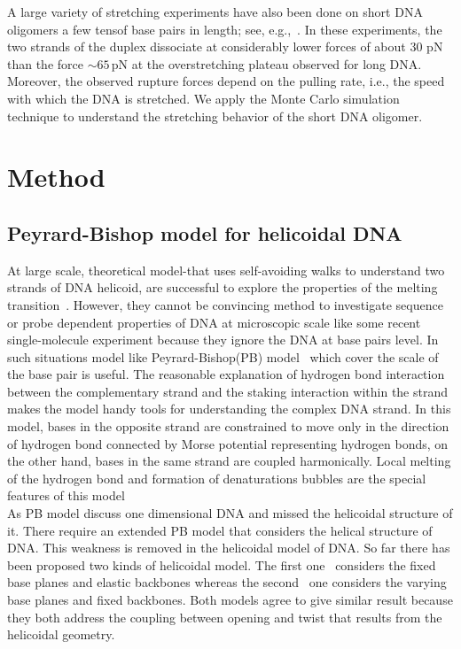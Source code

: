 \documentclass[12pt,masters,final]{UTRGVthesis}
\begin{document}
A large variety of stretching experiments have also been done on short DNA oligomers a few tensof base pairs in length; see, e.g.,~\cite{Strunz:1999, Pope:2001, Morfill:2007}. In these experiments, the two strands of the duplex dissociate at considerably lower forces of about 30 pN than the force $\sim 65$\,pN at the overstretching plateau observed for long DNA. Moreover, the observed rupture forces depend on the pulling rate, i.e., the speed with which the DNA is stretched. We apply the Monte Carlo simulation technique to understand the stretching behavior of the short DNA oligomer.
%
\newpage
\chapter{Method}
%
\section{Peyrard-Bishop model for helicoidal DNA}
At large scale, theoretical model-that uses self-avoiding walks to understand two strands of DNA helicoid, are successful to explore the properties of the melting transition~\cite{martin2000localization,kafri2000dna,carlon2002roles}. However, they cannot be convincing method to investigate sequence or probe dependent properties of DNA at microscopic scale like some recent single-molecule experiment because they ignore the DNA at base pairs level. In such situations model like Peyrard-Bishop(PB) model~\cite{peyrard1989statistical} which cover the scale of the base pair is useful. The reasonable explanation of hydrogen bond interaction between the complementary strand and the staking interaction within the strand makes the model handy tools for understanding the complex DNA strand. In this model, bases in the opposite strand are constrained to move only in the direction of hydrogen bond connected by Morse potential representing hydrogen bonds, on the other hand, bases in the same strand are coupled harmonically. Local melting of the hydrogen bond and formation of denaturations bubbles are the special features of this model\\
\indent
As PB model discuss one dimensional DNA and missed the helicoidal structure of it. There require an extended PB model that considers the helical structure of DNA. This weakness is removed in the helicoidal model of DNA. So far there has been proposed two kinds of helicoidal model. The first one~\cite{barbi2003thermal} considers the fixed base planes and elastic backbones whereas the second~\cite{cocco1999statistical} one considers the varying base planes and fixed backbones. Both models agree to give similar result because they both address the coupling between opening and twist that results from the helicoidal geometry.\\
\end{document}
